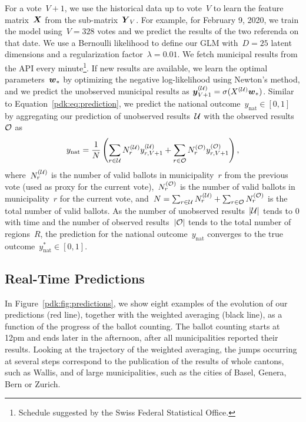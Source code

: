 For a vote~$V+1$, we use the historical data up to vote~$V$ to learn the feature matrix~$\mbox{$\mbox{$\boldsymbol{X}$}$}$ from the sub-matrix~$\mbox{$\mbox{$\boldsymbol{Y}$}$}_V$.
For example, for February 9, 2020, we train the model using~$V = 328$ votes and we predict the results of the two referenda on that date.
We use a Bernoulli likelihood to define our GLM with~$D=25$ latent dimensions and a regularization factor~$\lambda=0.01$.
We fetch municipal results from the API every minute\footnote{Schedule suggested by the Swiss Federal Statistical Office.}.
If new results are available, we learn the optimal parameters~$\mbox{$\mbox{$\boldsymbol{w}$}$}_*$ by optimizing the negative log-likelihood using Newton's method, and we predict the unobserved municipal results as $\mbox{$\mbox{$\boldsymbol{y}$}$}_{V+1}^{(\mathcal{U})} = \sigma(X^{(\mathcal{U})} \mbox{$\mbox{$\boldsymbol{w}$}$}_*)$.
Similar to Equation~\eqref{pdk:eq:prediction}, we predict the national outcome~$y_{\textrm{nat}} \in [0, 1]$ by aggregating our prediction of unobserved results~$\mathcal{U}$ with the observed results~$\mathcal{O}$ as
\begin{equation*}
	y_{\textrm{nat}} = \frac{1}{N} \left( \sum_{r \in \mathcal{U}} N_r^{(\mathcal{U})} y_{r, V+1}^{(\mathcal{U})} + \sum_{r \in \mathcal{O}} N_r^{(\mathcal{O})} y_{r, V+1}^{(\mathcal{O})} \right),
\end{equation*}
where~$N_r^{(\mathcal{U})}$ is the number of valid ballots in municipality~$r$ from the previous vote (used as proxy for the current vote),~$N_r^{(\mathcal{O})}$ is the number of valid ballots in municipality~$r$ for the current vote, and~$N = \sum_{r \in \mathcal{U}} N_r^{(\mathcal{U})} + \sum_{r \in \mathcal{O}} N_r^{(\mathcal{O})}$ is the total number of valid ballots.
As the number of unobserved results~$\vert \mathcal{U} \vert$ tends to 0 with time and the number of observed results~$\vert \mathcal{O} \vert$ tends to the total number of regions~$R$, the prediction for the national outcome~$y_{\textrm{nat}}$ converges to the true outcome~$y_{\textrm{nat}}^* \in [0, 1]$.

\subsection{Real-Time Predictions}

In Figure~\ref{pdk:fig:predictions}, we show eight examples of the evolution of our predictions (red line), together with the weighted averaging (black line), as a function of the progress of the ballot counting.
The ballot counting starts at 12pm and ends later in the afternoon, after all municipalities reported their results.
Looking at the trajectory of the weighted averaging, the jumps occurring at several steps correspond to the publication of the results of whole cantons, such as Wallis, and of large municipalities, such as the cities of Basel, Genera, Bern or Zurich.

